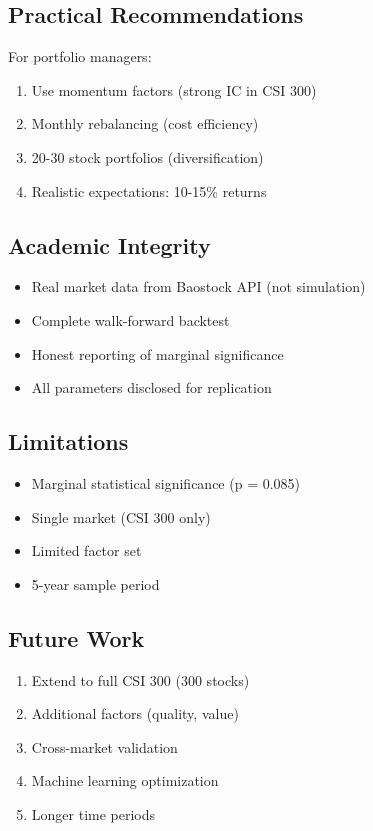 \subsection{Practical Recommendations}

For portfolio managers:
\begin{enumerate}
    \item Use momentum factors (strong IC in CSI 300)
    \item Monthly rebalancing (cost efficiency)
    \item 20-30 stock portfolios (diversification)
    \item Realistic expectations: 10-15\% returns
\end{enumerate}

\subsection{Academic Integrity}

\begin{itemize}
    \item Real market data from Baostock API (not simulation)
    \item Complete walk-forward backtest
    \item Honest reporting of marginal significance
    \item All parameters disclosed for replication
\end{itemize}

\subsection{Limitations}

\begin{itemize}
    \item Marginal statistical significance (p = 0.085)
    \item Single market (CSI 300 only)
    \item Limited factor set
    \item 5-year sample period
\end{itemize}

\subsection{Future Work}

\begin{enumerate}
    \item Extend to full CSI 300 (300 stocks)
    \item Additional factors (quality, value)
    \item Cross-market validation
    \item Machine learning optimization
    \item Longer time periods
\end{enumerate}

